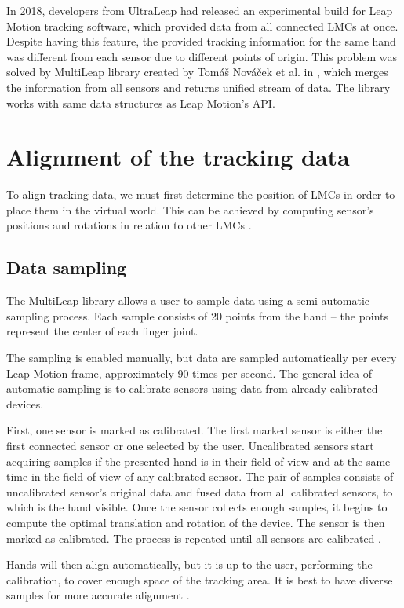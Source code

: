 
In 2018, developers from UltraLeap had released an experimental build for Leap Motion tracking software, which provided data from all connected LMCs at once. Despite having this feature, the provided tracking information for the same hand was different from each sensor due to different points of origin. This problem was solved by MultiLeap library created by Tomáš Nováček et al. in \cite{tomasMultileap}, which merges the information from all sensors and returns unified stream of data. The library works with same data structures as Leap Motion's API.

\section{Alignment of the tracking data}

To align tracking data, we must first determine the position of LMCs in order to place them in the virtual world. This can be achieved by computing sensor's positions and rotations in relation to other LMCs \cite{tomasMultileap}.

\subsection{Data sampling}

The MultiLeap library allows a user to sample data using a semi-automatic sampling process. Each sample consists of 20 points from the hand – the points represent the center of each finger joint. 

The sampling is enabled manually, but data are sampled automatically per every Leap Motion frame, approximately 90 times per second. The general idea of automatic sampling is to calibrate sensors using data from already calibrated devices.

First, one sensor is marked as calibrated. The first marked sensor is either the first connected sensor or one selected by the user. Uncalibrated sensors start acquiring samples if the presented hand is in their field of view and at the same time in the field of view of any calibrated sensor. The pair of samples consists of uncalibrated sensor's original data and fused data from all calibrated sensors, to which is the hand visible. Once the sensor collects enough samples, it begins to compute the optimal translation and rotation of the device. The sensor is then marked as calibrated. The process is repeated until all sensors are calibrated \cite{tomasMultileap}.


Hands will then align automatically, but it is up to the user, performing the calibration, to cover enough space of the tracking area. It is best to have diverse samples for more accurate alignment \cite{tomasMultileap}.

